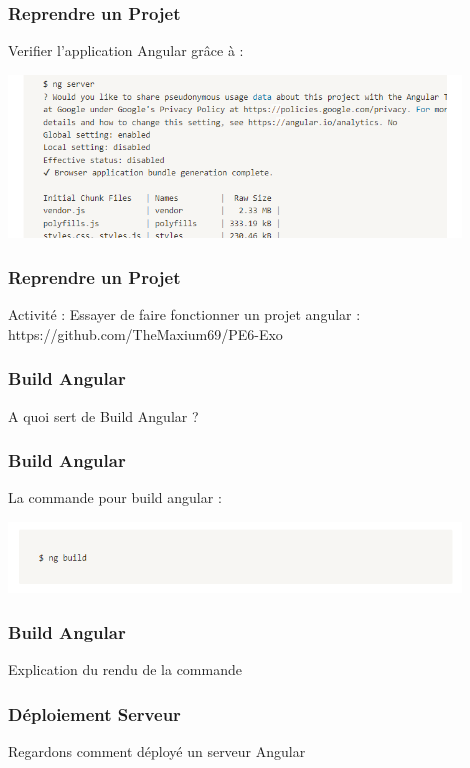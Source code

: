 \documentclass[10pt]{beamer}
\begin{document}
    \begin{frame}
        \frametitle{Reprendre un Projet}

        Verifier l'application Angular grâce à : \newline

        \centering
        \includegraphics[width=12cm]{assets/ngserve}


    \end{frame}

    \begin{frame}
        \frametitle{Reprendre un Projet}

        Activité : \newline \newline
        Essayer de faire fonctionner un projet angular : \newline \newline
        https://github.com/TheMaxium69/PE6-Exo

    \end{frame}




    \begin{frame}
        \frametitle{Build Angular}

        A quoi sert de Build Angular ?

    \end{frame}

    \begin{frame}
        \frametitle{Build Angular}

        La commande pour build angular :

        \centering
        \includegraphics[width=12cm]{assets/ngbuild}

    \end{frame}

    \begin{frame}
        \frametitle{Build Angular}

        Explication du rendu de la commande

    \end{frame}



    \begin{frame}
        \frametitle{Déploiement Serveur}


        Regardons comment déployé un serveur Angular



    \end{frame}
\end{document}
